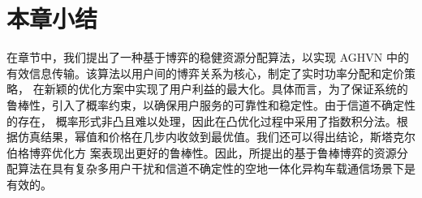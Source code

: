 \section{本章小结}\label{section2-5}
在章节中，我们提出了一种基于博弈的稳健资源分配算法，以实现 AGHVN 中的有效信息传输。该算法以用户间的博弈关系为核心，制定了实时功率分配和定价策略，
在新颖的优化方案中实现了用户利益的最大化。具体而言，为了保证系统的鲁棒性，引入了概率约束，以确保用户服务的可靠性和稳定性。由于信道不确定性的存在，
概率形式非凸且难以处理，因此在凸优化过程中采用了指数积分法。根据仿真结果，幂值和价格在几步内收敛到最优值。我们还可以得出结论，斯塔克尔伯格博弈优化方
案表现出更好的鲁棒性。因此，所提出的基于鲁棒博弈的资源分配算法在具有复杂多用户干扰和信道不确定性的空地一体化异构车载通信场景下是有效的。






















